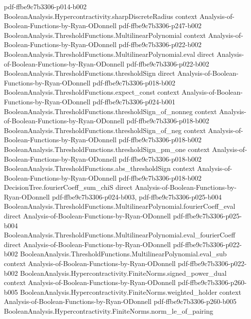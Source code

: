 \begin{theorem}
  {pdf-ffbe9c7b3306-p014-b002}
\proofstep
  {BooleanAnalysis.Hypercontractivity.sharpDiscreteRadius}
  {context}
  {Analysis-of-Boolean-Functions-by-Ryan-ODonnell}
  {pdf-ffbe9c7b3306-p247-b002}
\proofstep
  {BooleanAnalysis.ThresholdFunctions.MultilinearPolynomial}
  {context}
  {Analysis-of-Boolean-Functions-by-Ryan-ODonnell}
  {pdf-ffbe9c7b3306-p022-b002}
\proofstep
  {BooleanAnalysis.ThresholdFunctions.MultilinearPolynomial.eval}
  {direct}
  {Analysis-of-Boolean-Functions-by-Ryan-ODonnell}
  {pdf-ffbe9c7b3306-p022-b002}
\proofstep
  {BooleanAnalysis.ThresholdFunctions.thresholdSign}
  {direct}
  {Analysis-of-Boolean-Functions-by-Ryan-ODonnell}
  {pdf-ffbe9c7b3306-p018-b002}
\proofstep
  {BooleanAnalysis.ThresholdFunctions.expect_const}
  {context}
  {Analysis-of-Boolean-Functions-by-Ryan-ODonnell}
  {pdf-ffbe9c7b3306-p024-b001}
\proofstep
  {BooleanAnalysis.ThresholdFunctions.thresholdSign_of_nonneg}
  {context}
  {Analysis-of-Boolean-Functions-by-Ryan-ODonnell}
  {pdf-ffbe9c7b3306-p018-b002}
\proofstep
  {BooleanAnalysis.ThresholdFunctions.thresholdSign_of_neg}
  {context}
  {Analysis-of-Boolean-Functions-by-Ryan-ODonnell}
  {pdf-ffbe9c7b3306-p018-b002}
\proofstep
  {BooleanAnalysis.ThresholdFunctions.thresholdSign_pm_one}
  {context}
  {Analysis-of-Boolean-Functions-by-Ryan-ODonnell}
  {pdf-ffbe9c7b3306-p018-b002}
\proofstep
  {BooleanAnalysis.ThresholdFunctions.abs_thresholdSign}
  {context}
  {Analysis-of-Boolean-Functions-by-Ryan-ODonnell}
  {pdf-ffbe9c7b3306-p018-b002}
\proofstep
  {DecisionTree.fourierCoeff_sum_chiS}
  {direct}
  {Analysis-of-Boolean-Functions-by-Ryan-ODonnell}
  {pdf-ffbe9c7b3306-p024-b003,
    pdf-ffbe9c7b3306-p025-b004}
\proofstep
  {BooleanAnalysis.ThresholdFunctions.MultilinearPolynomial.fourierCoeff_eval}
  {direct}
  {Analysis-of-Boolean-Functions-by-Ryan-ODonnell}
  {pdf-ffbe9c7b3306-p025-b004}
\proofstep
  {BooleanAnalysis.ThresholdFunctions.MultilinearPolynomial.eval_fourierCoeff}
  {direct}
  {Analysis-of-Boolean-Functions-by-Ryan-ODonnell}
  {pdf-ffbe9c7b3306-p022-b002}
\proofstep
  {BooleanAnalysis.ThresholdFunctions.MultilinearPolynomial.eval_sub}
  {context}
  {Analysis-of-Boolean-Functions-by-Ryan-ODonnell}
  {pdf-ffbe9c7b3306-p022-b002}
\proofstep
  {BooleanAnalysis.Hypercontractivity.FiniteNorms.signed_power_dual}
  {context}
  {Analysis-of-Boolean-Functions-by-Ryan-ODonnell}
  {pdf-ffbe9c7b3306-p260-b005}
\proofstep
  {BooleanAnalysis.Hypercontractivity.FiniteNorms.weighted_holder}
  {context}
  {Analysis-of-Boolean-Functions-by-Ryan-ODonnell}
  {pdf-ffbe9c7b3306-p260-b005}
\proofstep
  {BooleanAnalysis.Hypercontractivity.FiniteNorms.norm_le_of_pairing}

\end{theorem}
